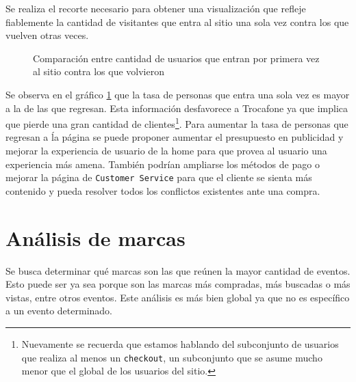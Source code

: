 \documentclass[a4paper]{article}
\begin{document}
Se realiza el recorte necesario para obtener una visualización que refleje fiablemente la cantidad de visitantes que entra al sitio una sola vez contra los que vuelven otras veces. 

\begin{figure}[h!]
	\caption{Comparación entre cantidad de usuarios que entran por primera vez al sitio contra los que volvieron}
	\label{fig:newvsreturning}
\end{figure}

Se observa en el gráfico \ref{fig:newvsreturning} que la tasa de personas que entra una sola vez es mayor a la de las que regresan. Esta información desfavorece a Trocafone ya que implica que pierde una gran cantidad de clientes\footnote{Nuevamente se recuerda que estamos hablando del subconjunto de usuarios que realiza al menos un \texttt{checkout}, un subconjunto que se asume mucho menor que el global de los usuarios del sitio.}. Para aumentar la tasa de personas que regresan a ĺa página se puede proponer aumentar el presupuesto en publicidad y mejorar la experiencia de usuario de la home para que provea al usuario una experiencia más amena. También podrían ampliarse los métodos de pago o mejorar la página de \texttt{Customer Service} para que el cliente se sienta más contenido y pueda resolver todos los conflictos existentes ante una compra.

\section{Análisis de marcas}

Se busca determinar qué marcas son las que reúnen la mayor cantidad de eventos. Esto puede ser ya sea porque son las marcas más compradas, más buscadas o más vistas, entre otros eventos. Este análisis es más bien global ya que no es específico a un evento determinado.
\end{document}
